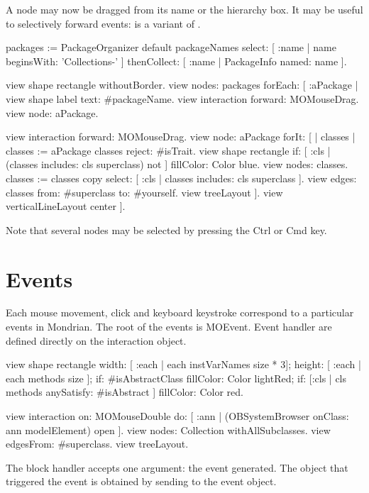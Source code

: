 \documentclass[a4paper,10pt,twoside]{book}
\begin{document}
A node may now be dragged from its name or the hierarchy box. It may be useful to selectively forward events:  is a variant of .

\begin{code}{}
packages := PackageOrganizer default packageNames
        select: [ :name | name beginsWith: 'Collections-' ] 
        thenCollect:  [ :name | PackageInfo named: name ].

view shape rectangle withoutBorder.
view nodes: packages forEach: [ :aPackage | 
  view shape label text: #packageName.
  view interaction forward: MOMouseDrag.
  view node: aPackage.

  view interaction forward: MOMouseDrag.
  view node: aPackage forIt: [
    | classes |
    classes := aPackage classes reject: #isTrait.
    view shape rectangle 
      if: [ :cls | (classes includes: cls superclass) not ] fillColor: Color blue.
    view nodes: classes.
    classes := classes copy select: [ :cls | classes includes: cls superclass ].
    view edges: classes from: #superclass to: #yourself.
    view treeLayout
  ].
  view verticalLineLayout center
].
\end{code}

Note that several nodes may be selected by pressing the Ctrl or Cmd key. 

\section{Events}


Each mouse movement, click and keyboard keystroke correspond to a particular events in Mondrian. The root of the events is MOEvent. Event handler are defined directly on the interaction object.  

\begin{code}{}
view shape rectangle
  width: [ :each | each instVarNames size * 3];
  height: [ :each | each methods size ];
  if: #isAbstractClass fillColor: Color lightRed;
  if: [:cls | cls methods anySatisfy: #isAbstract ] fillColor: Color red.
  
view interaction on: MOMouseDouble do: [ :ann | 
  (OBSystemBrowser onClass: ann modelElement) open
].
view nodes: Collection withAllSubclasses.
view edgesFrom: #superclass.
view treeLayout.
\end{code}

The block handler accepts one argument: the event generated. The object that triggered the event is obtained by sending  to the event object. 
\end{document}
